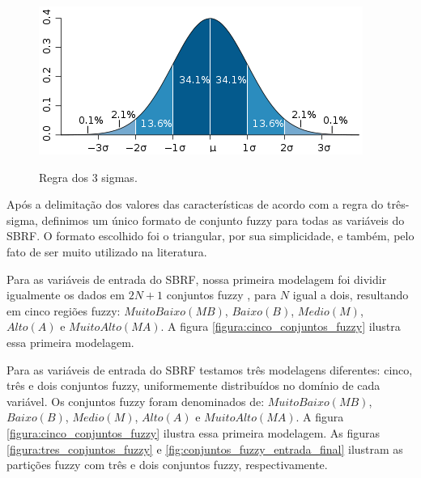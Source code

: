 \begin{figure}[h]
\caption{Regra dos 3 sigmas.}
\centering
\includegraphics[scale=0.85]{regra-dos-3-sigma.png}
\label{figura:regra_3_sigmas}
\end{figure}

Após a delimitação dos valores das características de acordo com a regra do três-sigma, definimos um único formato de conjunto fuzzy para todas as variáveis do SBRF. O formato escolhido foi o triangular, por sua simplicidade, e também, pelo fato de ser muito utilizado na literatura.

Para as variáveis de entrada do SBRF, nossa primeira modelagem foi dividir igualmente os dados em $2N + 1$ conjuntos fuzzy \cite{wang1992generating}, para $N$ igual a dois, resultando em cinco regiões fuzzy: $Muito Baixo (MB)$, $Baixo (B)$, $Medio (M)$, $Alto (A)$ e $Muito Alto (MA)$. A figura \ref{figura:cinco_conjuntos_fuzzy} ilustra essa primeira modelagem.

Para as variáveis de entrada do SBRF testamos três modelagens diferentes: cinco, três e dois conjuntos fuzzy, uniformemente distribuídos no domínio de cada variável. Os conjuntos fuzzy foram denominados de: $Muito Baixo (MB)$, $Baixo (B)$, $Medio (M)$, $Alto (A)$ e $Muito Alto (MA)$. A figura \ref{figura:cinco_conjuntos_fuzzy} ilustra essa primeira modelagem. As figuras \ref{figura:tres_conjuntos_fuzzy} e \ref{fig:conjuntos_fuzzy_entrada_final} ilustram as partições fuzzy com três e dois conjuntos fuzzy, respectivamente.

